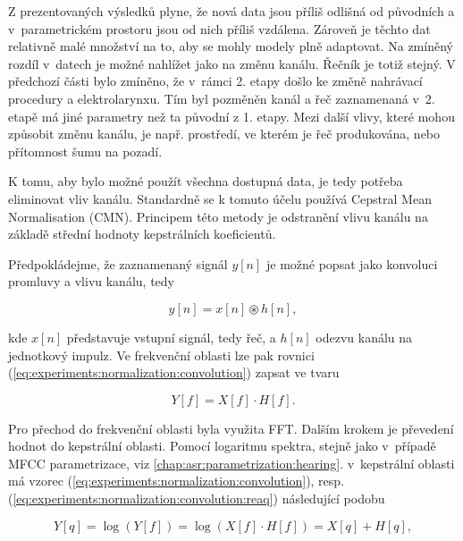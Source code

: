 Z prezentovaných výsledků plyne, že nová data jsou příliš odlišná od původních a v~parametrickém prostoru jsou od nich příliš vzdálena.
Zároveň je těchto dat relativně malé množství na to, aby se mohly modely plně adaptovat.
Na zmíněný rozdíl v~datech je možné nahlížet jako na změnu kanálu.
Řečník je totiž stejný.
V předchozí části bylo zmíněno, že v~rámci 2. etapy došlo ke změně nahrávací procedury a elektrolarynxu.
Tím byl pozměněn kanál a řeč zaznamenaná v~2. etapě  má jiné parametry než ta původní z 1. etapy.
Mezi další vlivy, které mohou způsobit změnu kanálu, je např. prostředí, ve kterém je řeč produkována, nebo přítomnost šumu na pozadí.

K tomu, aby bylo možné použít všechna dostupná data, je tedy potřeba eliminovat vliv kanálu.
Standardně se k tomuto účelu používá Cepstral Mean Normalisation (CMN). Principem této metody je odstranění vlivu kanálu na základě střední hodnoty kepstrálních koeficientů.

Předpokládejme, že zaznamenaný signál $y[n]$ je možné popsat jako konvoluci promluvy a vlivu kanálu, tedy

\begin{equation}
  y\left[n\right] = x\left[n\right] \circledast h\left[n\right],
  \label{eq:experiments:normalization:convolution}
\end{equation}

\noindent kde $x\left[n\right]$ představuje vstupní signál, tedy řeč, a $h\left[n\right]$ odezvu kanálu na jednotkový impulz.
Ve frekvenční oblasti lze pak rovnici (\ref{eq:experiments:normalization:convolution}) zapsat ve tvaru

\begin{equation}
  Y\left[f\right] = X\left[f\right] \cdot H\left[f\right].
  \label{eq:experiments:normalization:convolution:reaq}
\end{equation}

\noindent Pro přechod do frekvenční oblasti byla využita FFT.
Dalším krokem je převedení hodnot do kepstrální oblasti.
Pomocí logaritmu spektra, stejně jako v~případě MFCC parametrizace, viz \ref{chap:asr:parametrization:hearing}. v~kepstrální oblasti má vzorec (\ref{eq:experiments:normalization:convolution}), resp. (\ref{eq:experiments:normalization:convolution:reaq}) následující podobu

\begin{equation}
  Y\left[q\right] = \log\left(Y\left[f\right]\right) = \log\left(X\left[f\right] \cdot H\left[f\right]\right) = X\left[q\right] + H\left[q\right],
\end{equation}

